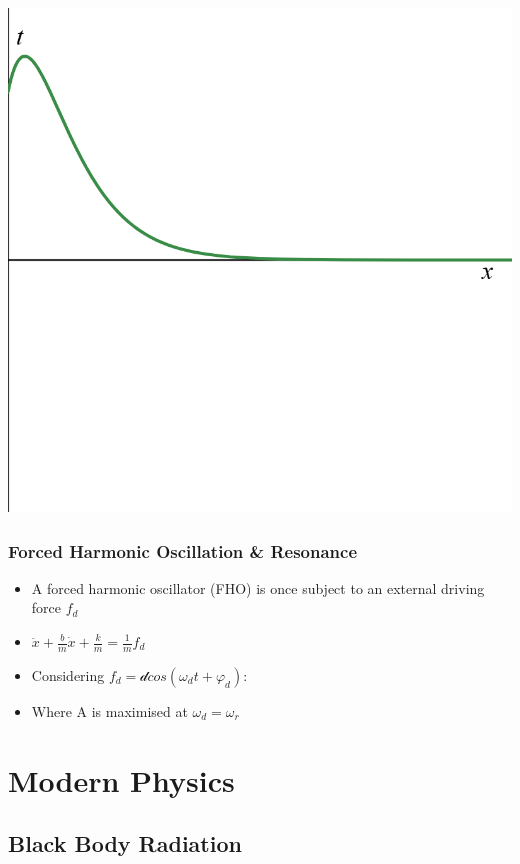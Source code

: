 \documentclass{article}
\begin{document}
\begin{itemize}
    \includegraphics[width=.5\linewidth]{year1/wfmp/periodic-motion/critically damped.png}

\end{itemize}

\subsubsection*{Forced Harmonic Oscillation \& Resonance}

\begin{itemize}
    \item A forced harmonic oscillator (FHO) is once subject to an external driving force \(f_d\)
    \item \(\ddot x + \frac{b}{m}\dot x + \frac{k}{m}=\frac{1}{m}f_d\)
    \item Considering \(f_d=\mathcal d cos(\omega_dt+\varphi_d)\):
    \item Where A is maximised at \(\omega_d=\omega_r\)
\end{itemize}



\newpage
\section{Modern Physics}
\subsection{Black Body Radiation}

\end{document}
